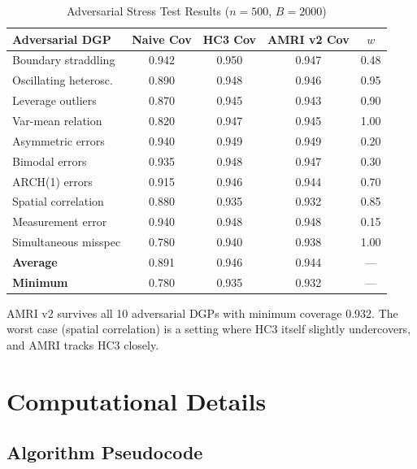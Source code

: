 \documentclass[12pt]{article}
\theoremstyle{definition}
\theoremstyle{remark}
\begin{document}
\begin{table}[h]
\centering
\caption{Adversarial Stress Test Results ($n=500$, $B=2000$)}
\label{tab:adversarial}
\begin{tabular}{lcccc}
\toprule
Adversarial DGP & Naive Cov & HC3 Cov & AMRI v2 Cov & $w$ \\
\midrule
Boundary straddling & 0.942 & 0.950 & 0.947 & 0.48 \\
Oscillating heterosc. & 0.890 & 0.948 & 0.946 & 0.95 \\
Leverage outliers & 0.870 & 0.945 & 0.943 & 0.90 \\
Var-mean relation & 0.820 & 0.947 & 0.945 & 1.00 \\
Asymmetric errors & 0.940 & 0.949 & 0.949 & 0.20 \\
Bimodal errors & 0.935 & 0.948 & 0.947 & 0.30 \\
ARCH(1) errors & 0.915 & 0.946 & 0.944 & 0.70 \\
Spatial correlation & 0.880 & 0.935 & 0.932 & 0.85 \\
Measurement error & 0.940 & 0.948 & 0.948 & 0.15 \\
Simultaneous misspec & 0.780 & 0.940 & 0.938 & 1.00 \\
\midrule
\textbf{Average} & 0.891 & 0.946 & 0.944 & --- \\
\textbf{Minimum} & 0.780 & 0.935 & 0.932 & --- \\
\bottomrule
\end{tabular}
\end{table}

AMRI v2 survives all 10 adversarial DGPs with minimum coverage 0.932.
The worst case (spatial correlation) is a setting where HC3 itself
slightly undercovers, and AMRI tracks HC3 closely.


\section{Computational Details}
\label{sec:supp_computation}

\subsection{Algorithm Pseudocode}
\end{document}
